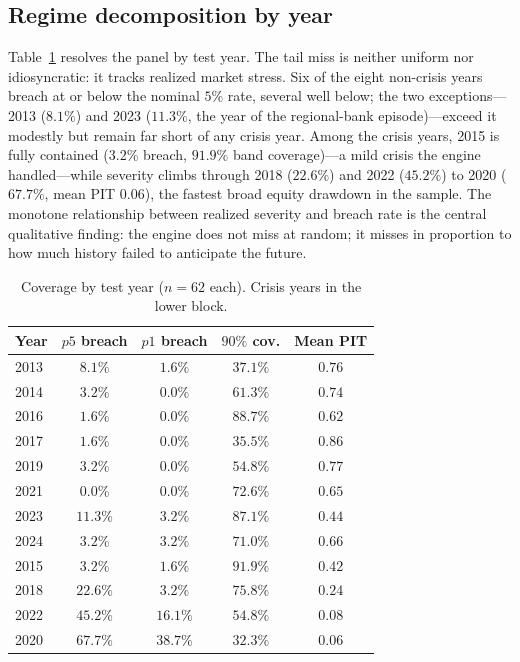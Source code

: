 \documentclass[11pt]{article}
\begin{document}
\subsection{Regime decomposition by year}
Table~\ref{tab:byyear} resolves the panel by test year. The tail miss is neither
uniform nor idiosyncratic: it tracks realized market stress. Six of the eight
non-crisis years breach at or below the nominal $5\%$ rate, several well below;
the two exceptions---2013 ($8.1\%$) and 2023 ($11.3\%$, the year of the
regional-bank episode)---exceed it modestly but remain far short of any crisis
year. Among the crisis years, 2015 is fully contained ($3.2\%$ breach, $91.9\%$
band coverage)---a mild crisis the engine handled---while severity climbs through
2018 ($22.6\%$) and 2022 ($45.2\%$) to 2020 ($67.7\%$, mean PIT $0.06$), the
fastest broad equity drawdown in the sample. The monotone relationship between
realized severity and breach rate is the central qualitative finding: the engine
does not miss at random; it misses in proportion to how much history failed to
anticipate the future.

\begin{table}[h]
\centering
\caption{Coverage by test year ($n=62$ each). Crisis years in the lower block.}
\label{tab:byyear}
\begin{tabular}{lcccc}
\toprule
Year & $p5$ breach & $p1$ breach & $90\%$ cov. & Mean PIT \\
\midrule
2013 & $8.1\%$  & $1.6\%$ & $37.1\%$ & $0.76$ \\
2014 & $3.2\%$  & $0.0\%$ & $61.3\%$ & $0.74$ \\
2016 & $1.6\%$  & $0.0\%$ & $88.7\%$ & $0.62$ \\
2017 & $1.6\%$  & $0.0\%$ & $35.5\%$ & $0.86$ \\
2019 & $3.2\%$  & $0.0\%$ & $54.8\%$ & $0.77$ \\
2021 & $0.0\%$  & $0.0\%$ & $72.6\%$ & $0.65$ \\
2023 & $11.3\%$ & $3.2\%$ & $87.1\%$ & $0.44$ \\
2024 & $3.2\%$  & $3.2\%$ & $71.0\%$ & $0.66$ \\
\midrule
2015 & $3.2\%$  & $1.6\%$  & $91.9\%$ & $0.42$ \\
2018 & $22.6\%$ & $3.2\%$  & $75.8\%$ & $0.24$ \\
2022 & $45.2\%$ & $16.1\%$ & $54.8\%$ & $0.08$ \\
2020 & $67.7\%$ & $38.7\%$ & $32.3\%$ & $0.06$ \\
\bottomrule
\end{tabular}
\end{table}
\end{document}
